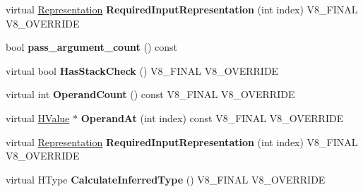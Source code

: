 \begin{DoxyCompactItemize}
\item 
\hypertarget{classv8_1_1internal_1_1_v8___f_i_n_a_l_a28d1e5e9dbe5084579ff639d5275ed98}{}virtual \hyperlink{classv8_1_1internal_1_1_representation}{Representation} {\bfseries Required\+Input\+Representation} (int index) V8\+\_\+\+F\+I\+N\+A\+L V8\+\_\+\+O\+V\+E\+R\+R\+I\+D\+E\label{classv8_1_1internal_1_1_v8___f_i_n_a_l_a28d1e5e9dbe5084579ff639d5275ed98}

\item 
\hypertarget{classv8_1_1internal_1_1_v8___f_i_n_a_l_a0645d499104fc72f7bc82edc2e947d3c}{}bool {\bfseries pass\+\_\+argument\+\_\+count} () const \label{classv8_1_1internal_1_1_v8___f_i_n_a_l_a0645d499104fc72f7bc82edc2e947d3c}

\item 
\hypertarget{classv8_1_1internal_1_1_v8___f_i_n_a_l_a9289cc6aea057609bb63f1b84ff7edb9}{}virtual bool {\bfseries Has\+Stack\+Check} () V8\+\_\+\+F\+I\+N\+A\+L V8\+\_\+\+O\+V\+E\+R\+R\+I\+D\+E\label{classv8_1_1internal_1_1_v8___f_i_n_a_l_a9289cc6aea057609bb63f1b84ff7edb9}

\item 
\hypertarget{classv8_1_1internal_1_1_v8___f_i_n_a_l_a0d2595d0e78efb3f1d1ec04cc3ad18a2}{}virtual int {\bfseries Operand\+Count} () const V8\+\_\+\+F\+I\+N\+A\+L V8\+\_\+\+O\+V\+E\+R\+R\+I\+D\+E\label{classv8_1_1internal_1_1_v8___f_i_n_a_l_a0d2595d0e78efb3f1d1ec04cc3ad18a2}

\item 
\hypertarget{classv8_1_1internal_1_1_v8___f_i_n_a_l_a792ef24f6585fbc1b57548f336fff4f8}{}virtual \hyperlink{classv8_1_1internal_1_1_h_value}{H\+Value} $\ast$ {\bfseries Operand\+At} (int index) const V8\+\_\+\+F\+I\+N\+A\+L V8\+\_\+\+O\+V\+E\+R\+R\+I\+D\+E\label{classv8_1_1internal_1_1_v8___f_i_n_a_l_a792ef24f6585fbc1b57548f336fff4f8}

\item 
\hypertarget{classv8_1_1internal_1_1_v8___f_i_n_a_l_a28d1e5e9dbe5084579ff639d5275ed98}{}virtual \hyperlink{classv8_1_1internal_1_1_representation}{Representation} {\bfseries Required\+Input\+Representation} (int index) V8\+\_\+\+F\+I\+N\+A\+L V8\+\_\+\+O\+V\+E\+R\+R\+I\+D\+E\label{classv8_1_1internal_1_1_v8___f_i_n_a_l_a28d1e5e9dbe5084579ff639d5275ed98}

\item 
\hypertarget{classv8_1_1internal_1_1_v8___f_i_n_a_l_abce680a9da404b1ba5ce75e5969c2497}{}virtual H\+Type {\bfseries Calculate\+Inferred\+Type} () V8\+\_\+\+F\+I\+N\+A\+L V8\+\_\+\+O\+V\+E\+R\+R\+I\+D\+E\label{classv8_1_1internal_1_1_v8___f_i_n_a_l_abce680a9da404b1ba5ce75e5969c2497}


\end{DoxyCompactItemize}
